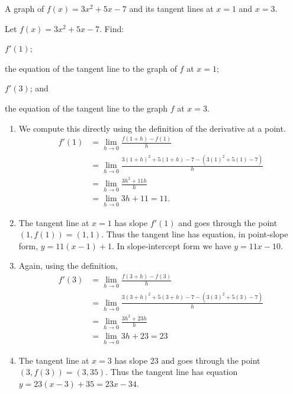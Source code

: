 \begin{marginfigure}[1cm]
\caption{A graph of $f(x) = 3x^2+5x-7$ and its tangent lines at $x=1$ and $x=3$.}\label{fig:2.1.Eg3}
\end{marginfigure}

\begin{example} \label{Ex:2.1.Eg3}
Let $f(x) = 3x^2+5x-7$. Find: 
\begin{enumerate*}[1)]
\item $f'(1)$; 	
\item the equation of the tangent line to the graph of $f$ at $x=1$; 
\item $f'(3)$; and 
\item the equation of the tangent line to the graph $f$ at $x=3$.
\end{enumerate*}
	
\solution
\begin{enumerate}[1)]
\item We compute this directly using the definition of the derivative at a point.
\begin{align*}
f'(1) &= \lim_{h \to 0} \frac{f(1+h)-f(1)}{h} \\
&=	\lim_{h \to 0} \frac{3(1+h)^2+5(1+h)-7 - (3(1)^2+5(1)-7)}{h}\\
&=	\lim_{h\to 0} \frac{3h^2+11h}{h}\\
&= 	\lim_{h\to 0} 3h+11=11.
\end{align*}

\item The tangent line at $x=1$ has slope $f'(1)$ and goes through the point $(1,f(1)) = (1,1)$. Thus the tangent line has equation, in point-slope form, $y = 11(x-1) + 1$. In slope-intercept form we have $y = 11x-10$.
	
\item Again, using the definition,
\begin{align*}
f'(3) &=	\lim_{h \to 0} \frac{f(3+h)-f(3)}{h} \\
&=	\lim_{h \to 0} \frac{3(3+h)^2+5(3+h)-7 - (3(3)^2+5(3)-7)}{h} \\
&=	\lim_{h \to 0} \frac{3h^2+23h}{h}\\
&= \lim_{h \to 0} 3h+23 = 23
\end{align*}
	
\item The tangent line at $x=3$ has slope $23$ and goes through the point $(3,f(3)) = (3,35)$. Thus the tangent line has equation $y=23(x-3)+35 = 23x-34$.
\end{enumerate}
\end{example}